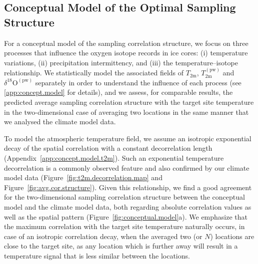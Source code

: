 \documentclass[draft]{agujournal2019}
\begin{document}
\subsection{Conceptual Model of the Optimal Sampling Structure}
\label{discussion:concept.model}

For a conceptual model of the sampling correlation structure, we focus on three
processes that influence the oxygen isotope records in ice cores: (i)
temperature variations, (ii) precipitation intermittency, and (iii) the
temperature--isotope relationship. We statistically model the associated fields
of $T_{\mathrm{2m}}$, $T_{2\mathrm{m}}^{\mathrm{(pw)}}$ and
$\delta^{18}\mathrm{O}^{\mathrm{(pw)}}$ separately in order to understand the
influence of each process (see \ref{app:concept.model} for details), and we
assess, for comparable results, the predicted average sampling correlation
structure with the target site temperature in the two-dimensional case of
averaging two locations in the same manner that we analysed the climate model
data.

To model the atmospheric temperature field, we assume an isotropic exponential
decay of the spatial correlation with a constant decorrelation length
(Appendix~\ref{app:concept.model.t2m}). Such an exponential temperature
decorrelation is a commonly observed feature \cite{Jones1997} and also
confirmed by our climate model data (Figure~\ref{fig:t2m.decorrelation.map} and
Figure~\ref{fig:avg.cor.structure}). Given this relationship, we find a good
agreement for the two-dimensional sampling correlation structure between the
conceptual model and the climate model data, both regarding absolute correlation
values as well as the spatial pattern (Figure~\ref{fig:conceptual.model}a). We
emphasize that the maximum correlation with the target site temperature
naturally occurs, in case of an isotropic correlation decay, when the averaged
two (or $N$) locations are close to the target site, as any location which is
further away will result in a temperature signal that is less similar between
the locations.
\end{document}
